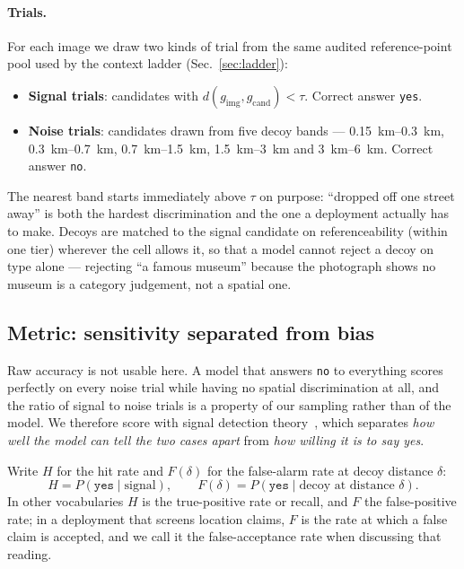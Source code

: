\documentclass[10pt,a4paper]{article}
\begin{document}
\paragraph{Trials.} For each image we draw two kinds of trial from the same
audited reference-point pool used by the context ladder
(Sec.~\ref{sec:ladder}):

\begin{itemize}
  \item \textbf{Signal trials}: candidates with
  $d(g_{\mathrm{img}}, g_{\mathrm{cand}}) < \tau$. Correct answer \texttt{yes}.
  \item \textbf{Noise trials}: candidates drawn from five decoy bands ---
  \SIrange{0.15}{0.3}{\kilo\metre}, \SIrange{0.3}{0.7}{\kilo\metre},
  \SIrange{0.7}{1.5}{\kilo\metre}, \SIrange{1.5}{3}{\kilo\metre} and
  \SIrange{3}{6}{\kilo\metre}. Correct answer \texttt{no}.
\end{itemize}

The nearest band starts immediately above $\tau$ on purpose: ``dropped off one
street away'' is both the hardest discrimination and the one a deployment
actually has to make. Decoys are matched to the signal candidate on
referenceability (within one tier) wherever the cell allows it, so that a model
cannot reject a decoy on type alone --- rejecting ``a famous museum'' because
the photograph shows no museum is a category judgement, not a spatial one.

\subsection{Metric: sensitivity separated from bias}
\label{sec:geoverify-metric}

Raw accuracy is not usable here. A model that answers \texttt{no} to everything
scores perfectly on every noise trial while having no spatial discrimination at
all, and the ratio of signal to noise trials is a property of our sampling
rather than of the model. We therefore score with signal detection
theory~\citep{green1966,macmillan2005}, which separates \emph{how well the
model can tell the two cases apart} from \emph{how willing it is to say yes}.

Write $H$ for the hit rate and $F(\delta)$ for the false-alarm rate at decoy
distance $\delta$:
%
\begin{equation}
H = P(\texttt{yes} \mid \text{signal}),
\qquad
F(\delta) = P(\texttt{yes} \mid \text{decoy at distance } \delta).
\end{equation}
%
In other vocabularies $H$ is the true-positive rate or recall, and $F$ the
false-positive rate; in a deployment that screens location claims, $F$ is the
rate at which a false claim is accepted, and we call it the false-acceptance
rate when discussing that reading.
\end{document}
